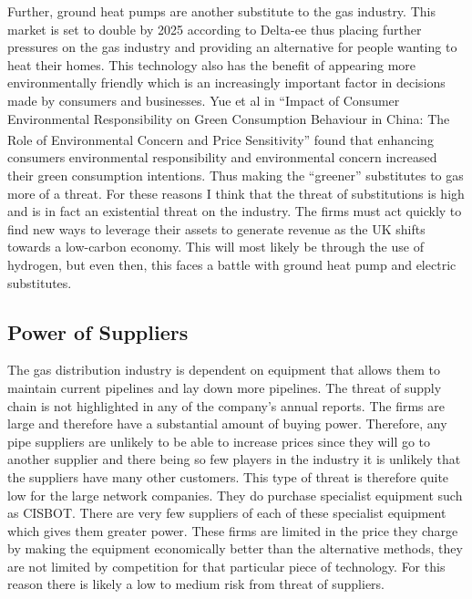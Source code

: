\documentclass[11pt]{article}		%
\newcommand{\supercite}[1]{\textsuperscript{\cite{#1}}}		%
\begin{document}
                Further, ground heat pumps are another substitute to the gas industry. This market is set to double by 2025 according to Delta-ee thus placing further pressures on the gas industry and providing an alternative for people wanting to heat their homes. This technology also has the benefit of appearing more environmentally friendly which is an increasingly important factor in decisions made by consumers and businesses. Yue et al in “Impact of Consumer Environmental Responsibility on Green Consumption Behaviour in China: The Role of Environmental Concern and Price Sensitivity” \supercite{Environmental} found that enhancing consumers environmental responsibility and environmental concern increased their green consumption intentions. Thus making the “greener” substitutes to gas more of a threat.
                For these reasons I think that the threat of substitutions is high and is in fact an existential threat on the industry. The firms must act quickly to find new ways to leverage their assets to generate revenue as the UK shifts towards a low-carbon economy. This will most likely be through the use of hydrogen, but even then, this faces a battle with ground heat pump and electric substitutes.

     
		\subsection[Power of Suppliers]{Power of Suppliers}
		        The gas distribution industry is dependent on equipment that allows them to maintain current pipelines and lay down more pipelines. The threat of supply chain is not highlighted in any of the company’s annual reports. The firms are large and therefore have a substantial amount of buying power. Therefore, any pipe suppliers are unlikely to be able to increase prices since they will go to another supplier and there being so few players in the industry it is unlikely that the suppliers have many other customers. This type of threat is therefore quite low for the large network companies.
                They do purchase specialist equipment such as CISBOT. There are very few suppliers of each of these specialist equipment which gives them greater power. These firms are limited in the price they charge by making the equipment economically better than the alternative methods, they are not limited by competition for that particular piece of technology.
                For this reason there is likely a low to medium risk from threat of suppliers.

		
\end{document}

